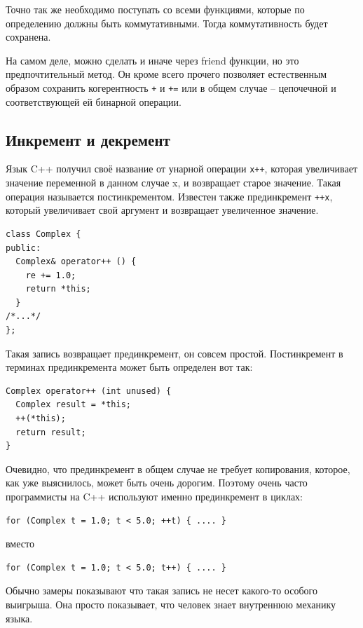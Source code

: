 \documentclass[a4paper,12pt,oneside]{book}
\begin{document}
Точно так же необходимо поступать со всеми функциями, которые по определению должны быть коммутативными. Тогда коммутативность будет сохранена.

На самом деле, можно сделать и иначе через friend функции, но это предпочтительный метод. Он кроме всего прочего позволяет естественным образом сохранить когерентность \lstinline!+! и \lstinline!+=! или в общем случае -- цепочечной и соответствующей ей бинарной операции.

\subsection{Инкремент и декремент}\label{IncrOverload}

Язык C++ получил своё название от унарной операции \lstinline!x++!, которая увеличивает значение переменной в данном случае x, и возвращает старое значение. Такая операция называется постинкрементом. Известен также прединкремент \lstinline!++x!, который увеличивает свой аргумент и возвращает увеличенное значение.

\begin{lstlisting}
class Complex {
public:
  Complex& operator++ () {
    re += 1.0;
    return *this;      
  }
/*...*/
};
\end{lstlisting}

Такая запись возвращает прединкремент, он совсем простой. Постинкремент в терминах прединкремента может быть определен вот так:

\begin{lstlisting}
Complex operator++ (int unused) {
  Complex result = *this;
  ++(*this);
  return result;
} 
\end{lstlisting}

Очевидно, что прединкремент в общем случае не требует копирования, которое, как уже выяснилось, может быть очень дорогим. Поэтому очень часто программисты на C++ используют именно прединкремент в циклах:

\begin{lstlisting}
for (Complex t = 1.0; t < 5.0; ++t) { .... }
\end{lstlisting}

вместо

\begin{lstlisting}
for (Complex t = 1.0; t < 5.0; t++) { .... }
\end{lstlisting}

Обычно замеры показывают что такая запись не несет какого-то особого выигрыша. Она просто показывает, что человек знает внутреннюю механику языка.
\end{document}
